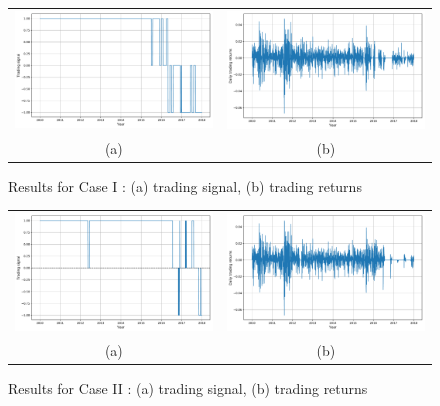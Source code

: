 \begin{figure}[h!] 
\begin{tabular}{cc}
\centering 
 \includegraphics[width=0.5\linewidth]{figures/tradingSig_yearly_llf10.pdf} & \includegraphics[width=0.5\linewidth]{figures/tradingRet_yearly_llf10.pdf} \\
  (a) & (b)
\end{tabular}
\caption{Results for Case I : (a) trading signal, (b) trading returns}
\label{fig:t1}
\end{figure}



\begin{figure}[h!] 
\begin{tabular}{cc}
\centering 
 \includegraphics[width=0.5\linewidth]{figures/tradingSig_llf10.pdf} & \includegraphics[width=0.5\linewidth]{figures/tradingRet_llf10.pdf} \\
  (a) & (b)
\end{tabular}
\caption{Results for Case II : (a) trading signal, (b) trading returns}
\label{fig:t2}
\end{figure}

